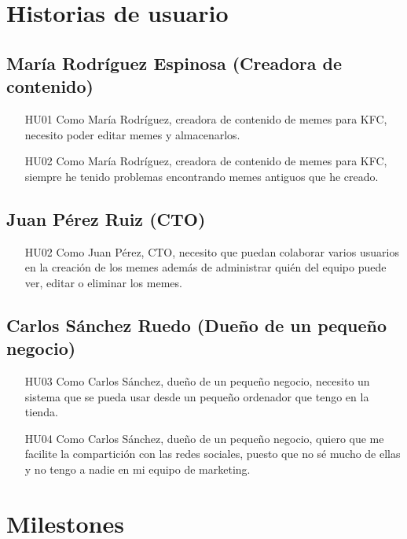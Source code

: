 \section{Historias de usuario}

    \subsection{María Rodríguez Espinosa (Creadora de contenido)}

    \begin{enumerate}
        \item [HU01] Como María Rodríguez, creadora de contenido de memes para KFC, necesito poder editar memes y almacenarlos.
        \item [HU02] Como María Rodríguez, creadora de contenido de memes para KFC, siempre he tenido problemas encontrando memes antiguos que he creado.
    \end{enumerate}

    \subsection{Juan Pérez Ruiz (CTO)}

        \begin{enumerate}
            \item [HU02] Como Juan Pérez, CTO, necesito que puedan colaborar varios usuarios en la creación de los memes además de administrar quién del equipo puede ver, editar o eliminar los memes.
        \end{enumerate}

    \subsection{Carlos Sánchez Ruedo (Dueño de un pequeño negocio)}

        \begin{enumerate}
            \item [HU03] Como Carlos Sánchez, dueño de un pequeño negocio, necesito un sistema que se pueda usar desde un pequeño ordenador que tengo en la tienda.
            \item [HU04] Como Carlos Sánchez, dueño de un pequeño negocio, quiero que me facilite la compartición con las redes sociales, puesto que no sé mucho de ellas y no tengo a nadie en mi equipo de marketing. 
        \end{enumerate}

\section{Milestones}

